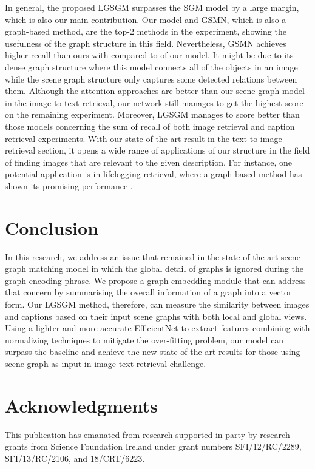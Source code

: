 \documentclass{IOS-Book-Article}
\begin{document}
In general, the proposed LGSGM surpasses the SGM model by a large margin, which is also our main contribution. Our model and GSMN, which is also a graph-based method, are the top-2 methods in the experiment, showing the usefulness of the graph structure in this field. Nevertheless, GSMN achieves higher recall than ours with  compared to  of our model. It might be due to its dense graph structure where this model connects all of the objects in an image while the scene graph structure only captures some detected relations between them. Although the attention approaches are better than our scene graph model in the image-to-text retrieval, our network still manages to get the highest score on the remaining experiment. Moreover, LGSGM manages to score better than those models concerning the sum of recall of both image retrieval and caption retrieval experiments. With our state-of-the-art result in the text-to-image retrieval section, it opens a wide range of applications of our structure in the field of finding images that are relevant to the given description. For instance, one potential application is in lifelogging retrieval, where a graph-based method has shown its promising performance \cite{mmm2021graph}.

\section{Conclusion}
In this research, we address an issue that remained in the state-of-the-art scene graph matching model in which the global detail of graphs is ignored during the graph encoding phrase. We propose a graph embedding module that can address that concern by summarising the overall information of a graph into a vector form. Our LGSGM method, therefore, can measure the similarity between images and captions based on their input scene graphs with both local and global views. Using a lighter and more accurate EfficientNet to extract features combining with normalizing techniques to mitigate the over-fitting problem, our model can surpass the baseline and achieve the new state-of-the-art results for those using scene graph as input in image-text retrieval challenge.

\section{Acknowledgments}
This publication has emanated from research supported in party by research grants from Science Foundation Ireland 
under grant numbers SFI/12/RC/2289, SFI/13/RC/2106, and 18/CRT/6223. 



\end{document}
